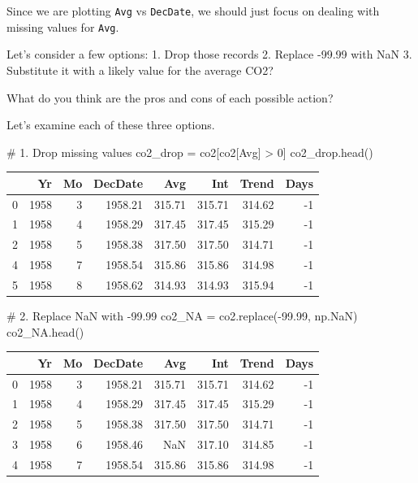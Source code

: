 \documentclass[
  letterpaper,
  DIV=11,
  numbers=noendperiod]{scrreprt}
\newenvironment{Shaded}{\begin{snugshade}}{\end{snugshade}}
\newcommand{\CommentTok}[1]{\textcolor[rgb]{0.37,0.37,0.37}{#1}}
\newcommand{\DecValTok}[1]{\textcolor[rgb]{0.68,0.00,0.00}{#1}}
\newcommand{\FloatTok}[1]{\textcolor[rgb]{0.68,0.00,0.00}{#1}}
\newcommand{\NormalTok}[1]{\textcolor[rgb]{0.00,0.23,0.31}{#1}}
\newcommand{\OperatorTok}[1]{\textcolor[rgb]{0.37,0.37,0.37}{#1}}
\newcommand{\StringTok}[1]{\textcolor[rgb]{0.13,0.47,0.30}{#1}}
\begin{document}
Since we are plotting \texttt{Avg} vs \texttt{DecDate}, we should just
focus on dealing with missing values for \texttt{Avg}.

Let's consider a few options: 1. Drop those records 2. Replace -99.99
with NaN 3. Substitute it with a likely value for the average CO2?

What do you think are the pros and cons of each possible action?

Let's examine each of these three options.

\begin{Shaded}
\begin{Highlighting}[]
\CommentTok{\# 1. Drop missing values}
\NormalTok{co2\_drop }\OperatorTok{=}\NormalTok{ co2[co2[}\StringTok{\textquotesingle{}Avg\textquotesingle{}}\NormalTok{] }\OperatorTok{\textgreater{}} \DecValTok{0}\NormalTok{]}
\NormalTok{co2\_drop.head()}
\end{Highlighting}
\end{Shaded}

\begin{tabular}{lrrrrrrr}
\toprule
{} &    Yr &  Mo &  DecDate &    Avg &    Int &  Trend &  Days \\
\midrule
0 &  1958 &   3 &  1958.21 & 315.71 & 315.71 & 314.62 &    -1 \\
1 &  1958 &   4 &  1958.29 & 317.45 & 317.45 & 315.29 &    -1 \\
2 &  1958 &   5 &  1958.38 & 317.50 & 317.50 & 314.71 &    -1 \\
4 &  1958 &   7 &  1958.54 & 315.86 & 315.86 & 314.98 &    -1 \\
5 &  1958 &   8 &  1958.62 & 314.93 & 314.93 & 315.94 &    -1 \\
\bottomrule
\end{tabular}

\begin{Shaded}
\begin{Highlighting}[]
\CommentTok{\# 2. Replace NaN with {-}99.99}
\NormalTok{co2\_NA }\OperatorTok{=}\NormalTok{ co2.replace(}\OperatorTok{{-}}\FloatTok{99.99}\NormalTok{, np.NaN)}
\NormalTok{co2\_NA.head()}
\end{Highlighting}
\end{Shaded}

\begin{tabular}{lrrrrrrr}
\toprule
{} &    Yr &  Mo &  DecDate &    Avg &    Int &  Trend &  Days \\
\midrule
0 &  1958 &   3 &  1958.21 & 315.71 & 315.71 & 314.62 &    -1 \\
1 &  1958 &   4 &  1958.29 & 317.45 & 317.45 & 315.29 &    -1 \\
2 &  1958 &   5 &  1958.38 & 317.50 & 317.50 & 314.71 &    -1 \\
3 &  1958 &   6 &  1958.46 &    NaN & 317.10 & 314.85 &    -1 \\
4 &  1958 &   7 &  1958.54 & 315.86 & 315.86 & 314.98 &    -1 \\
\bottomrule
\end{tabular}
\end{document}
